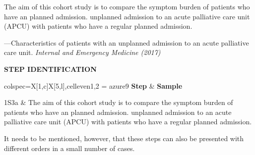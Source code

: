 \documentclass[a4paper]{ctexbook}
\begin{document}
\begin{sample}[label={myautocounter}]{\heiti}

  The aim of this cohort study is to compare the symptom burden of patients who have an planned admission. unplanned admission to an acute palliative care unit (APCU) with patients who have a regular planned admission.

  
  \begin{flushright}
    ---Characteristics of patients with an unplanned admission to an acute palliative care unit. \emph{Internal and Emergency Medicine (2017)}
  \end{flushright}

  \tcblower

  \noindent \textbf{STEP IDENTIFICATION}

  \vspace*{10pt}
  {\small\noindent
  \begin{tblr}{colspec={X[1,c]X[5,l]},cell{even}{1,2} = {azure9}}
    \toprule
    \textbf{Step} & \textbf{Sample} \\ 
    \midrule
    
    1S3a & The aim of this cohort study is to compare the symptom burden of patients who have an planned admission. unplanned admission to an acute palliative care unit (APCU) with patients who have a regular planned admission. \\
      
    \bottomrule
  \end{tblr}
  }

\end{sample}

It needs to be mentioned, however, that these steps can also be presented with different orders in a small number of cases.
\end{document}
